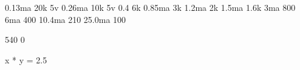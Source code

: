 0.13ma 20k 5v
0.26ma 10k 5v
0.4    6k
0.85ma 3k
1.2ma  2k
1.5ma  1.6k
3ma    800
6ma    400
10.4ma 210
25.0ma 100

540 0 

x * y = 2.5





